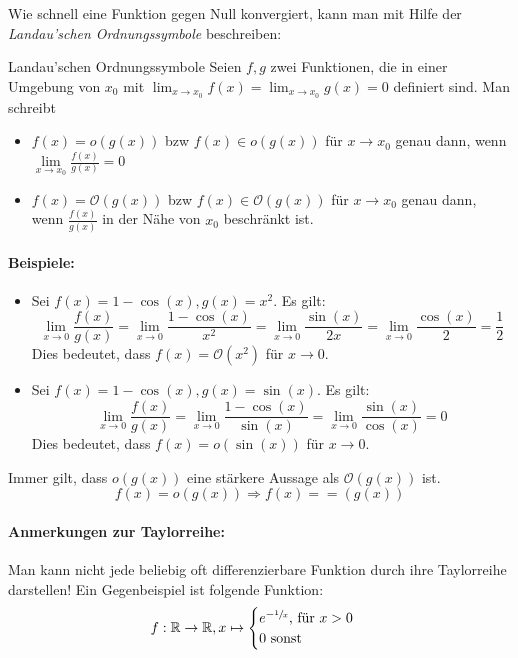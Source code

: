 Wie schnell eine Funktion gegen Null konvergiert, kann man mit Hilfe der \emph{Landau'schen Ordnungssymbole} beschreiben:
\begin{definition}{Landau'schen Ordnungssymbole}
	Seien $f,g$ zwei Funktionen, die in einer Umgebung von $x_0$ mit $\lim_{x\to x_0}f(x)=\lim_{x\to x_0}g(x)=0$ definiert sind. Man schreibt
	\begin{itemize}
		\item $f(x)=o(g(x))$ bzw $f(x)\in o(g(x))$ für $x\to x_0$ genau dann, wenn $\lim\limits_{x\to x_0}\frac{f(x)}{g(x)}=0$
		\item $f(x)=\mathcal O(g(x))$ bzw $f(x)\in \mathcal O(g(x))$ für $x\to x_0$ genau dann, wenn $\frac{f(x)}{g(x)}$ in der Nähe von $x_0$ beschränkt ist.
	\end{itemize}
\end{definition}
\paragraph{Beispiele:}
\begin{itemize}
	\item Sei $f(x)=1-\cos(x), g(x)=x^2$. Es gilt:
	\begin{equation*}
		\lim\limits_{x\to 0}\frac{f(x)}{g(x)}
		=\lim\limits_{x\to 0}\frac{1-\cos(x)}{x^2}
		=\lim\limits_{x\to 0}\frac{\sin(x)}{2x}
		=\lim\limits_{x\to 0}\frac{\cos(x)}{2}=\frac 12
	\end{equation*}
	Dies bedeutet, dass $f(x)=\mathcal O(x^2)$ für $x\to 0$.
	\item Sei $f(x)=1-\cos(x), g(x)=\sin(x)$. Es gilt:
	\begin{equation*}
		\lim\limits_{x\to 0}\frac{f(x)}{g(x)}
		=\lim\limits_{x\to 0}\frac{1-\cos(x)}{\sin(x)}
		=\lim\limits_{x\to 0}\frac{\sin(x)}{\cos(x)}
		=0
	\end{equation*}
	Dies bedeutet, dass $f(x)=o(\sin(x))$ für $x\to 0$.
\end{itemize}
Immer gilt, dass $o(g(x))$ eine stärkere Aussage als $\mathcal O(g(x))$ ist.
\begin{equation*}
	f(x)=o(g(x))\Rightarrow f(x)=\mathcal =(g(x))
\end{equation*}

\paragraph{Anmerkungen zur Taylorreihe:}
Man kann nicht jede beliebig oft differenzierbare Funktion durch ihre Taylorreihe darstellen! Ein Gegenbeispiel ist folgende Funktion:
\begin{equation*}
	f:\mathbb{R}\rightarrow\mathbb{R}, x\mapsto\begin{cases}
	e^{-\sfrac1x}\text{, für }x>0\\
	0\text{ sonst}
	\end{cases}
\end{equation*}


